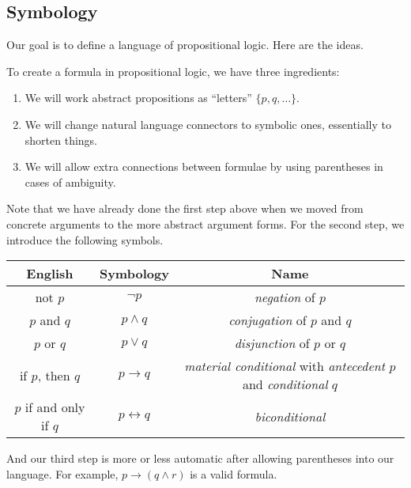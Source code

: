 \subsection{Symbology}
Our goal is to define a language of propositional logic. Here are the ideas.
\begin{idea}
	To create a formula in propositional logic, we have three ingredients:
	\begin{enumerate}
		\item We will work abstract propositions as ``letters'' $\{p,q,\ldots\}$.
		\item We will change natural language connectors to symbolic ones, essentially to shorten things.
		\item We will allow extra connections between formulae by using parentheses in cases of ambiguity.
	\end{enumerate}
\end{idea}
Note that we have already done the first step above when we moved from concrete arguments to the more abstract argument forms. For the second step, we introduce the following symbols.
\begin{center}
	\begin{tabular}{c|c|c}
		English & Symbology & Name \\\hline
		not $p$ & $\lnot p$ & \textit{negation} of $p$ \\
		$p$ and $q$ & $p\land q$ & \textit{conjugation} of $p$ and $q$ \\
		$p$ or $q$ & $p\lor q$ & \textit{disjunction} of $p$ or $q$ \\
		if $p$, then $q$ & $p\to q$ & \textit{material conditional} with \textit{antecedent} $p$ and \textit{conditional} $q$ \\
		$p$ if and only if $q$ & $p\leftrightarrow q$ & \textit{biconditional}
	\end{tabular}
\end{center}
And our third step is more or less automatic after allowing parentheses into our language. For example, $p\to(q\land r)$ is a valid formula.

